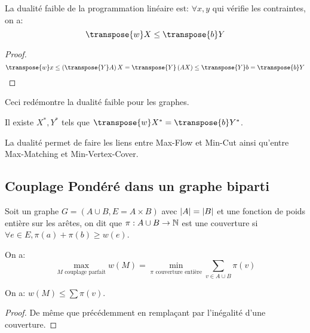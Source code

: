\documentclass[math, info]{cours}
\begin{document}
\begin{proposition}
	La dualité faible de la programmation linéaire est: $\forall x, y$ qui vérifie les contraintes, on a:
	\begin{equation*}
		\transpose{w}X \leq \transpose{b}Y
	\end{equation*}
	\label{prop:dualitylinearprog}
\end{proposition}
\begin{proof}
	\begin{equation*}
		\transpose{w}x \leq \left(\transpose{Y}A\right)X = \transpose{Y}\left(AX\right) \leq \transpose{Y}b= \transpose{b}Y
	\end{equation*}
\end{proof}

Ceci redémontre la dualité faible pour les graphes.

\begin{thm}
	Il existe $X^{*}, Y^{*}$ tels que $\transpose{w}X^{*} = \transpose{b}Y^{*}$.
\end{thm}
La dualité permet de faire les liens entre Max-Flow et Min-Cut ainsi qu'entre Max-Matching et Min-Vertex-Cover.

\subsection{Couplage Pondéré dans un graphe biparti}
\begin{definition}
	Soit un graphe $G = \left(A\cup B, E = A \times B\right)$ avec $\left|A\right| = \left|B\right|$ et une fonction de poids entière sur les arêtes, on dit que $\pi: A\cup B \to \mathbb{N}$ est une couverture si $\forall e \in E, \pi(a) + \pi(b) \geq w(e)$.
	\label{def:cover}
\end{definition}

\begin{thm}[Egrevary]
	On a:
	\begin{equation*}
		\max_{M \text{ couplage parfait}} w(M) = \min_{\pi \text{ couverture entière}} \sum_{v \in A\cup B} \pi(v)
	\end{equation*}
\end{thm}

\begin{proposition}
	On a: $w(M) \leq \sum \pi(v)$.
	\label{prop:weakduality2}
\end{proposition}
\begin{proof}
	De même que précédemment en remplaçant par l'inégalité d'une couverture.
\end{proof}
\end{document}
